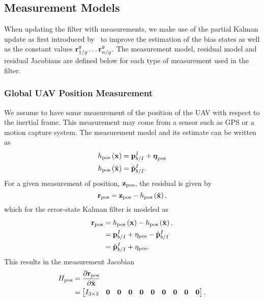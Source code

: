 
\subsection{Measurement Models}
\label{sec:measurement_models}

When
updating the filter with measurements, we make use of the partial Kalman update
as first introduced by~\cite{brink2017partial} to improve the estimation of the
bias states as well as the constant values $\vect{r}_{1/g}^{g} \dots
\vect{r}_{n/g}^{g}$. The measurement model, residual model and residual
Jacobians are defined below for each type of measurement used in the filter.

\subsubsection{Global UAV Position Measurement}
We assume to have some measurement of the position of the UAV with respect to
the inertial
frame. This measurement may come from a sensor such as GPS or a motion capture system.
The measurement model and its estimate can
be written as
\begin{align}
  h_{\text{pos}} \left( \boldsymbol{\mathrm{x}} \right) &= \boldsymbol{\mathrm{p}}_{b/I}^I +
  \boldsymbol{\mathrm{\eta}}_{\text{pos}} \\
  h_{\text{pos}} \left( \hat{\boldsymbol{\mathrm{x}}} \right) &= \hat{\boldsymbol{\mathrm{p}}}_{b/I}^I.
\end{align}
For a given measurement of position, $\boldsymbol{\mathrm{z}}_{\text{pos}}$, the residual is
given by
\begin{equation}
  \boldsymbol{\mathrm{r}}_{\text{pos}} = \boldsymbol{\mathrm{z}}_{\text{pos}} - h_{\text{pos}} \left( \hat{\boldsymbol{\mathrm{x}}}
  \right),
\end{equation}
which for the error-state Kalman filter is modeled as
\begin{align}
  \boldsymbol{\mathrm{r}}_{\text{pos}} &=  h_{\text{pos}} \left( \boldsymbol{\mathrm{x}} \right) - h_{\text{pos}} \left( \hat{\boldsymbol{\mathrm{x}}}
  \right), \\
                        &= \boldsymbol{\mathrm{p}}_{b/I}^I + \eta_{\text{pos}} -
                        \hat{\boldsymbol{\mathrm{p}}}_{b/I}^I \\
                        &= \tilde{\boldsymbol{\mathrm{p}}}_{b/I}^I + \eta_{\text{pos}}.
\end{align}
This results in the measurement Jacobian
\begin{align}
  H_{\text{pos}} &= \frac{\partial \boldsymbol{\mathrm{r}}_{\text{pos}}}{\partial \tilde{\boldsymbol{\mathrm{x}}}}\\
                 &=
  \begin{bmatrix}
    I_{3 \times 3} & \boldsymbol{\mathrm{0}} & \boldsymbol{\mathrm{0}} & \boldsymbol{\mathrm{0}} & \boldsymbol{\mathrm{0}} & \boldsymbol{\mathrm{0}} &
    \boldsymbol{\mathrm{0}} & \boldsymbol{\mathrm{0}} & \boldsymbol{\mathrm{0}} & \boldsymbol{\mathrm{0}}
  \end{bmatrix}.
\end{align}

